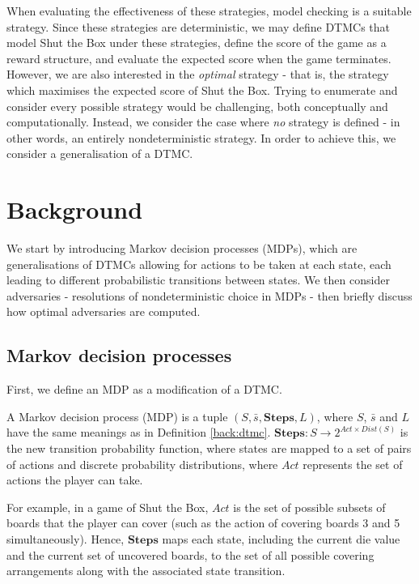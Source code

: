 When evaluating the effectiveness of these strategies, model checking is a suitable strategy. Since these strategies are deterministic, we may define DTMCs that model Shut the Box under these strategies, define the score of the game as a reward structure, and evaluate the expected score when the game terminates. However, we are also interested in the \emph{optimal} strategy - that is, the strategy which maximises the expected score of Shut the Box. Trying to enumerate and consider every possible strategy would be challenging, both conceptually and computationally. Instead, we consider the case where \emph{no} strategy is defined - in other words, an entirely nondeterministic strategy. In order to achieve this, we consider a generalisation of a DTMC.

\section{Background}
\label{cs1:stb_background}

We start by introducing Markov decision processes (MDPs), which are generalisations of DTMCs allowing for actions to be taken at each state, each leading to different probabilistic transitions between states. We then consider adversaries - resolutions of nondeterministic choice in MDPs - then briefly discuss how optimal adversaries are computed.

\subsection{Markov decision processes}
\label{cs1:mdps}
First, we define an MDP as a modification of a DTMC.

\begin{definition}
\label{cs1:def_mdps}

A Markov decision process (MDP) is a tuple $(S, \bar{s}, \mathbf{Steps}, L)$, where $S$, $\bar{s}$ and $L$ have the same meanings as in Definition \ref{back:dtmc}. $\mathbf{Steps} : S \rightarrow 2^{Act \times Dist(S)}$ is the new transition probability function, where states are mapped to a set of pairs of actions and discrete probability distributions, where $Act$ represents the set of actions the player can take.

\end{definition}

For example, in a game of Shut the Box, $Act$ is the set of possible subsets of boards that the player can cover (such as the action of covering boards 3 and 5 simultaneously). Hence, $\mathbf{Steps}$ maps each state, including the current die value and the current set of uncovered boards, to the set of all possible covering arrangements along with the associated state transition.

